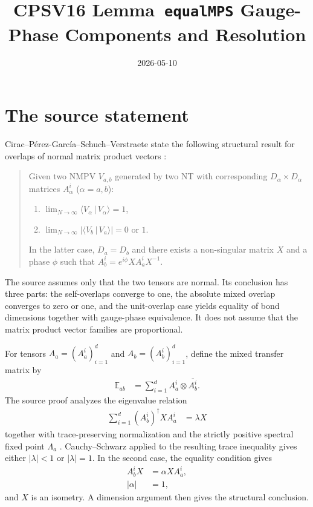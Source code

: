 \documentclass{article}
\title{CPSV16 Lemma~\texttt{equalMPS} Gauge-Phase Components and Resolution}
\author{}
\date{2026-05-10}
\begin{document}
\maketitle
{}

\section{The source statement}

Cirac--P\'erez-Garc\'ia--Schuch--Verstraete state the following structural
result for overlaps of normal matrix product vectors
\cite[Lemma~\texttt{equalMPS}, line~1081]{Cirac2016MPDO_arXiv}:

\begin{quote}
    Given two NMPV $V_{a,b}$ generated by two NT with corresponding
    $D_\alpha\times D_\alpha$ matrices $A_\alpha^i$ ($\alpha=a,b$):
    \begin{enumerate}
        \item $\lim_{N\to\infty}\langle V_\alpha\,|\,V_\alpha\rangle = 1$,
        \item $\lim_{N\to\infty}|\langle V_b\,|\,V_a\rangle| = 0$ or $1$.
    \end{enumerate}
    In the latter case, $D_a=D_b$ and there exists a non-singular matrix $X$
    and a phase $\phi$ such that $A_b^i = e^{i\phi} X A_a^i X^{-1}$.
\end{quote}

The source assumes only that the two tensors are normal. Its conclusion has
three parts: the self-overlaps converge to one, the absolute mixed overlap
converges to zero or one, and the unit-overlap case yields equality of bond
dimensions together with gauge-phase equivalence. It does not assume that the
matrix product vector families are proportional.

For tensors $A_a=(A_a^i)_{i=1}^d$ and $A_b=(A_b^i)_{i=1}^d$, define the mixed
transfer matrix by
\begin{align}
    \mathbb E_{ab}
        &= \sum_{i=1}^{d} A_a^i\otimes\overline{A_b^i}.
    \label{eq:cpsv16_equalMPS_gauge_phase_gap_cross_transfer}
\end{align}
The source proof analyzes the eigenvalue relation
\begin{align}
    \sum_{i=1}^{d}(A_b^i)^\dagger X A_a^i
        &= \lambda X
    \label{eq:cpsv16_equalMPS_gauge_phase_gap_eigenvalue_relation}
\end{align}
together with trace-preserving normalization and the strictly positive
spectral fixed point $\Lambda_a$
\cite[lines~1093--1117]{Cirac2016MPDO_arXiv}. Cauchy--Schwarz applied to the
resulting trace inequality gives either $|\lambda|<1$ or $|\lambda|=1$. In the
second case, the equality condition gives
\begin{align}
    A_b^iX
        &= \alpha XA_a^i,
    \label{eq:cpsv16_equalMPS_gauge_phase_gap_intertwining_relation}\\
    |\alpha|
        &= 1,
    \label{eq:cpsv16_equalMPS_gauge_phase_gap_phase_modulus}
\end{align}
and $X$ is an isometry. A dimension argument then gives the structural
conclusion.
\end{document}
